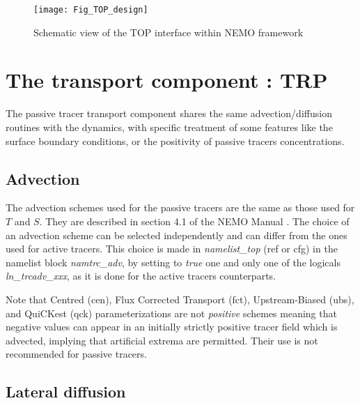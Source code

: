 \documentclass[../main/TOP_manual]{subfiles}
\begin{document}
\begin{figure}[ht]
\begin{center}
\vspace{0cm}
\texttt{[image: Fig\_TOP\_design]}
\caption{Schematic view of the TOP interface within NEMO framework}
\label{topdesign}
\end{center}
\end{figure}

\pagebreak

\section{The transport component : TRP}

The passive tracer transport component shares the same advection/diffusion routines with the dynamics, with specific treatment of some features like the surface boundary conditions, or the positivity of passive tracers concentrations.

\subsection{Advection}

The advection schemes used for the passive tracers are the same as those used for $T$ and $S$. They are described in section 4.1 of the NEMO Manual \citep{nemo_manual}.
The choice of an advection scheme can be selected independently and can differ from the ones used for active tracers.
This choice is made in \textit{namelist\_top} (ref or cfg) in the namelist block \textit{namtrc\_adv}, by setting to \textit{true} one and only one of the logicals \textit{ln\_trcadv\_xxx}, as it is done for the active tracers counterparts.

Note that Centred (cen), Flux Corrected Transport (fct), Upstream-Biased (ubs), and QuiCKest (qck) parameterizations are not \textit{positive} schemes meaning that negative values can appear in an initially strictly positive tracer field which is advected, implying that artificial extrema are permitted. Their use is not recommended for passive tracers.


\subsection{Lateral diffusion}
\end{document}
